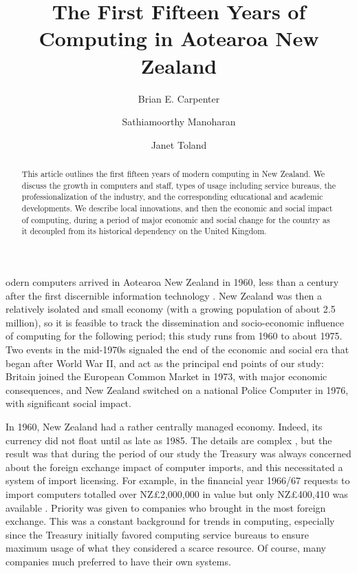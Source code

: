 \documentclass{IEEEcsmag}
\begin{document}

\title{The First Fifteen Years of Computing in Aotearoa New Zealand}

\author{Brian E. Carpenter}

\author{Sathiamoorthy Manoharan}

\author{Janet Toland}



\begin{abstract}This article outlines the first fifteen years of modern computing in New Zealand. We discuss the growth in computers and staff, types of usage including service bureaus, the professionalization of the industry, and the corresponding educational and academic developments. We describe local innovations, and then the economic and social impact of computing, during a period of major economic and social change for the country as it decoupled from its historical dependency on the United Kingdom.
\end{abstract}

\maketitle


odern computers arrived in Aotearoa New Zealand in 1960, less than a century after the first discernible information technology \cite{pioneers}. New Zealand was then a relatively isolated and small economy (with a growing population of about 2.5 million), so it is feasible to track the dissemination and socio-economic influence of computing for the following period; this study runs from 1960 to about 1975. Two events in the mid-1970s signaled the end of the economic and social era that began after World War II, and act as the principal end points of our study: Britain joined the European Common Market in 1973, with major economic consequences, and New Zealand switched on a national Police Computer in 1976, with significant social impact.

In 1960, New Zealand had a rather centrally managed economy. Indeed, its currency did not float until as late as 1985. The details are complex \cite{Sullivan2013}, but the result was that during the period of our study the Treasury was always concerned about the foreign exchange impact of computer imports, and this necessitated a system of import licensing. 
For example, in the financial year 1966/67 requests to import computers totalled over NZ£2,000,000 in value but only NZ£400,410 was available \cite{Treasury-1966}. Priority was given to companies who brought in the most foreign exchange. This was a constant background for trends in computing, especially since the Treasury initially favored computing service bureaus to ensure maximum usage of what they considered a scarce resource. Of course, many companies much preferred to have their own systems.
\end{document}
